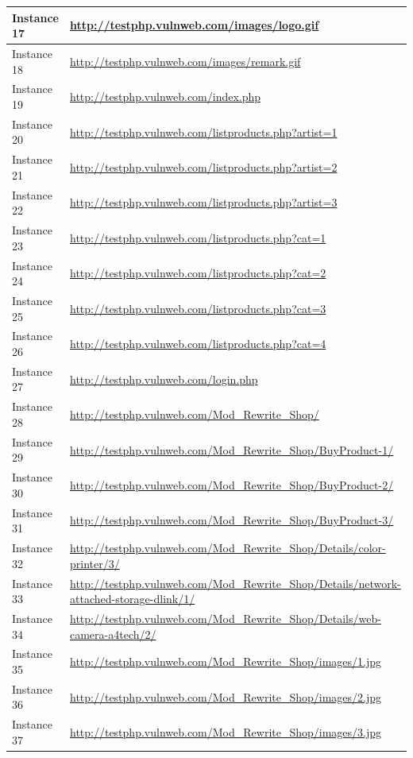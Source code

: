 \documentclass[12pt]{article}
\begin{document}
\begin{center}
\begin{longtable}{|l|p{10cm}|}
\hline
Instance 17 & \url{http://testphp.vulnweb.com/images/logo.gif} \\
\hline
Instance 18 & \url{http://testphp.vulnweb.com/images/remark.gif} \\
\hline
Instance 19 & \url{http://testphp.vulnweb.com/index.php} \\
\hline
Instance 20 & \url{http://testphp.vulnweb.com/listproducts.php?artist=1} \\
\hline
Instance 21 & \url{http://testphp.vulnweb.com/listproducts.php?artist=2} \\
\hline
Instance 22 & \url{http://testphp.vulnweb.com/listproducts.php?artist=3} \\
\hline
Instance 23 & \url{http://testphp.vulnweb.com/listproducts.php?cat=1} \\
\hline
Instance 24 & \url{http://testphp.vulnweb.com/listproducts.php?cat=2} \\
\hline
Instance 25 & \url{http://testphp.vulnweb.com/listproducts.php?cat=3} \\
\hline
Instance 26 & \url{http://testphp.vulnweb.com/listproducts.php?cat=4} \\
\hline
Instance 27 & \url{http://testphp.vulnweb.com/login.php} \\
\hline
Instance 28 & \url{http://testphp.vulnweb.com/Mod\_Rewrite\_Shop/} \\
\hline
Instance 29 & \url{http://testphp.vulnweb.com/Mod\_Rewrite\_Shop/BuyProduct-1/} \\
\hline
Instance 30 & \url{http://testphp.vulnweb.com/Mod\_Rewrite\_Shop/BuyProduct-2/} \\
\hline
Instance 31 & \url{http://testphp.vulnweb.com/Mod\_Rewrite\_Shop/BuyProduct-3/} \\
\hline
Instance 32 & \url{http://testphp.vulnweb.com/Mod\_Rewrite\_Shop/Details/color-printer/3/} \\
\hline
Instance 33 & \url{http://testphp.vulnweb.com/Mod\_Rewrite\_Shop/Details/network-attached-storage-dlink/1/} \\
\hline
Instance 34 & \url{http://testphp.vulnweb.com/Mod\_Rewrite\_Shop/Details/web-camera-a4tech/2/} \\
\hline
Instance 35 & \url{http://testphp.vulnweb.com/Mod\_Rewrite\_Shop/images/1.jpg} \\
\hline
Instance 36 & \url{http://testphp.vulnweb.com/Mod\_Rewrite\_Shop/images/2.jpg} \\
\hline
Instance 37 & \url{http://testphp.vulnweb.com/Mod\_Rewrite\_Shop/images/3.jpg} \\

\end{longtable}
\end{center}
\end{document}
